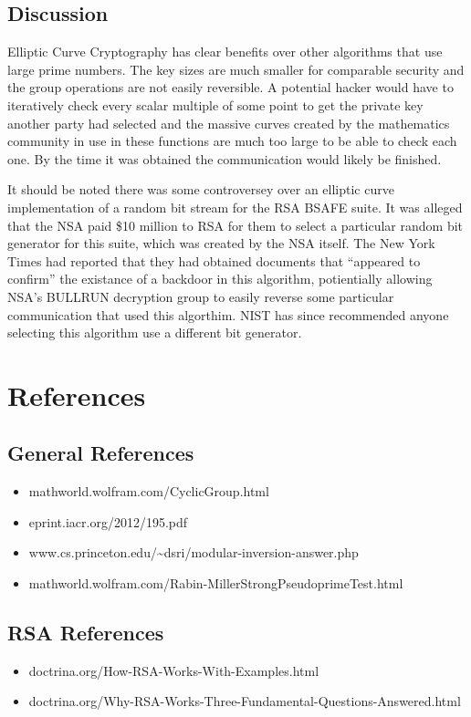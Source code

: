 \documentclass[conference]{IEEEtran}
\begin{document}
\subsection{Discussion}
Elliptic Curve Cryptography has clear benefits over other algorithms that use large prime numbers. The key sizes are much smaller for comparable security and the group operations are not easily reversible. A potential hacker would have to iteratively check every scalar multiple of some point to get the private key another party had selected and the massive curves created by the mathematics community in use in these functions are much too large to be able to check each one. By the time it was obtained the communication would likely be finished.

It should be noted there was some controversey over an elliptic curve implementation of a random bit stream for the RSA BSAFE suite. It was alleged that the NSA paid \$10 million to RSA for them to select a particular random bit generator for this suite, which was created by the NSA itself. The New York Times had reported that they had obtained documents that ``appeared to confirm'' the existance of a backdoor in this algorithm, potientially allowing NSA's BULLRUN decryption group to easily reverse some particular communication that used this algorthim. NIST has since recommended anyone selecting this algorithm use a different bit generator.


\section{References}
\subsection{General References}
\begin{itemize}
\item mathworld.wolfram.com/CyclicGroup.html \newline
\item eprint.iacr.org/2012/195.pdf \newline
\item www.cs.princeton.edu/\textasciitilde dsri/modular-inversion-answer.php \newline
\item mathworld.wolfram.com/Rabin-MillerStrongPseudoprimeTest.html \newline
\end{itemize}

\subsection{RSA References}
\begin{itemize}
\item doctrina.org/How-RSA-Works-With-Examples.html \newline
\item doctrina.org/Why-RSA-Works-Three-Fundamental-Questions-Answered.html \newline
\end{itemize}
\end{document}
